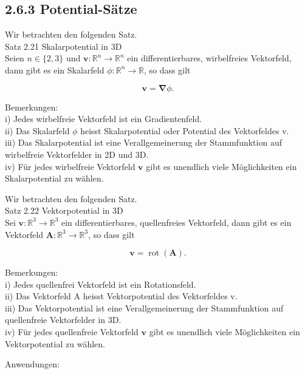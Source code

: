 \documentclass[10pt]{article}
\begin{document}
\subsection*{2.6.3 Potential-Sätze}
Wir betrachten den folgenden Satz.\\
Satz 2.21 Skalarpotential in 3D\\
Seien $n \in\{2,3\}$ und $\mathbf{v}: \mathbb{R}^{n} \rightarrow \mathbb{R}^{n}$ ein differentierbares, wirbelfreies Vektorfeld, dann gibt es ein Skalarfeld $\phi: \mathbb{R}^{n} \rightarrow \mathbb{R}$, so dass gilt


\begin{equation*}
\mathbf{v}=\boldsymbol{\nabla} \phi . \tag{2.181}
\end{equation*}


Bemerkungen:\\
i) Jedes wirbelfreie Vektorfeld ist ein Gradientenfeld.\\
ii) Das Skalarfeld $\phi$ heisst Skalarpotential oder Potential des Vektorfeldes v.\\
iii) Das Skalarpotential ist eine Verallgemeinerung der Stammfunktion auf wirbelfreie Vektorfelder in 2D und 3D.\\
iv) Für jedes wirbelfreie Vektorfeld $\mathbf{v}$ gibt es unendlich viele Möglichkeiten ein Skalarpotential zu wählen.

Wir betrachten den folgenden Satz.\\
Satz 2.22 Vektorpotential in 3D\\
Sei $\mathbf{v}: \mathbb{R}^{3} \rightarrow \mathbb{R}^{3}$ ein differentierbares, quellenfreies Vektorfeld, dann gibt es ein Vektorfeld $\mathbf{A}: \mathbb{R}^{3} \rightarrow \mathbb{R}^{3}$, so dass gilt


\begin{equation*}
\mathbf{v}=\operatorname{rot}(\mathbf{A}) . \tag{2.182}
\end{equation*}


Bemerkungen:\\
i) Jedes quellenfrei Vektorfeld ist ein Rotationsfeld.\\
ii) Das Vektorfeld A heisst Vektorpotential des Vektorfeldes v.\\
iii) Das Vektorpotential ist eine Verallgemeinerung der Stammfunktion auf quellenfreie Vektorfelder in 3D.\\
iv) Für jedes quellenfreie Vektorfeld $\mathbf{v}$ gibt es unendlich viele Möglichkeiten ein Vektorpotential zu wählen.

Anwendungen:
\end{document}
